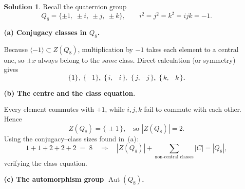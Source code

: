 \documentclass[12pt]{article}
\DeclareMathOperator{\Aut}{Aut}
\theoremstyle{definition} %
\newtheorem{solution}{Solution}
\theoremstyle{plain} %
\begin{document}
                        \begin{solution}
                          Recall the quaternion group
                          \[
                             Q_{8}= \{\pm1,\;\pm i,\;\pm j,\;\pm k\},
                             \qquad
                             i^{2}=j^{2}=k^{2}=ijk=-1 .
                          \]
                          
                          \bigskip
                          \textbf{(a) Conjugacy classes in \(Q_{8}\).}
                          
                          Because
                          \(\langle -1\rangle\subset Z(Q_{8})\), multiplication by \(-1\)
                          takes each element to a central one, so \(\pm x\) always belong to the
                          \emph{same} class.  Direct calculation (or symmetry) gives
                          \[
                             \boxed{\;
                               \{1\},\;
                               \{-1\},\;
                               \{\,i,-i\,\},\;
                               \{\,j,-j\,\},\;
                               \{\,k,-k\,\}.
                             \;}
                          \]
                          
                          \bigskip
                          \textbf{(b) The centre and the class equation.}
                          
                          Every element commutes with \(\pm1\), while
                          \(i,j,k\) fail to commute with each other.
                          Hence
                          \[
                             Z(Q_{8})=\{\,\pm1\,\},
                             \quad\text{so }|Z(Q_{8})|=2.
                          \]
                          Using the conjugacy–class sizes found in~(a):
                          \[
                             1 + 1 + 2 + 2 + 2 \;=\; 8
                             \quad\Longrightarrow\quad
                             |Z(Q_{8})|+\sum\limits_{\text{non-central classes}}|C|
                             =|Q_{8}|,
                          \]
                          verifying the class equation.
                          
                          \bigskip
                          \textbf{(c) The automorphism group \(\Aut(Q_{8})\).}
                          

\end{solution}
\end{document}
